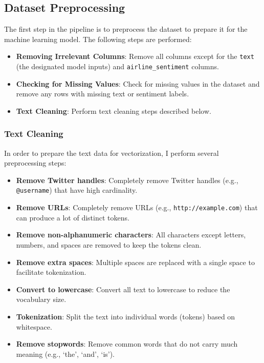 \documentclass{article}
\begin{document}
\subsection{Dataset Preprocessing}

The first step in the pipeline is to preprocess the dataset to prepare it for the machine learning model. The following steps are performed:

\begin{itemize}
    \item \textbf{Removing Irrelevant Columns}: Remove all columns except for the \texttt{text} (the designated model inputs) and \texttt{airline\_sentiment} columns.
    \item \textbf{Checking for Missing Values}: Check for missing values in the dataset and remove any rows with missing text or sentiment labels.
    \item \textbf{Text Cleaning}: Perform text cleaning steps described below.
\end{itemize}

\subsubsection{Text Cleaning}

In order to prepare the text data for vectorization, I perform several preprocessing steps:

\begin{itemize}
    \item \textbf{Remove Twitter handles}: Completely remove Twitter handles (e.g., \texttt{@username}) that have high cardinality.
    \item \textbf{Remove URLs}: Completely remove URLs (e.g., \texttt{http://example.com}) that can produce a lot of distinct tokens.
    \item \textbf{Remove non-alphanumeric characters}: All characters except letters, numbers, and spaces are removed to keep the tokens clean.
    \item \textbf{Remove extra spaces}: Multiple spaces are replaced with a single space to facilitate tokenization.
    \item \textbf{Convert to lowercase}: Convert all text to lowercase to reduce the vocabulary size.
    \item \textbf{Tokenization}: Split the text into individual words (tokens) based on whitespace.
    \item \textbf{Remove stopwords}: Remove common words that do not carry much meaning (e.g., `the', `and', `is').
\end{itemize}
\end{document}
